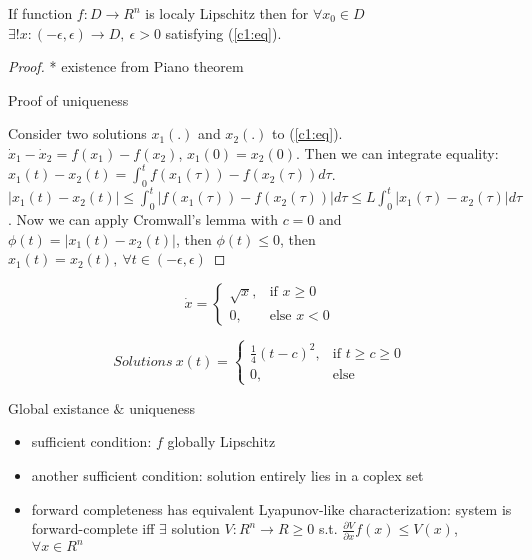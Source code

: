 \begin{Theorem}
If function $f:D \rightarrow R^n$ is localy Lipschitz then for $\forall x_0 \in D$
\ $\exists ! x:(-\epsilon, \epsilon) \rightarrow D, \ \epsilon > 0$
satisfying (\ref{c1:eq}).

\begin{proof}

* existence from Piano theorem

Proof of uniqueness

Consider two solutions $x_1(.)$ and $x_2(.)$ to (\ref{c1:eq}). $\dot x_1-\dot x_2=f(x_1)-f(x_2)$,
$x_1(0)=x_2(0)$. Then we can integrate equality: 
$x_1(t)-x_2(t)=\int^t_0 f(x_1(\tau))-f(x_2(\tau)) d\tau$.  
$|x_1(t)-x_2(t)| \le \int^t_0 |f(x_1(\tau))-f(x_2(\tau))| d\tau \le 
L \int^t_0 |x_1(\tau)-x_2(\tau)| d\tau$. Now we can apply Cromwall's lemma with $c=0$
and $\phi(t)=|x_1(t)-x_2(t)|$, then $\phi(t)\le 0$, then $x_1(t)=x_2(t), \ \forall t 
\in (-\epsilon,\epsilon)$
\end{proof}
\end{Theorem}

\begin{Example}
\begin{equation*}
    \dot x = 
    \begin{cases}
      \sqrt{x}, & \mbox{if } x \ge 0 \\
      0, & \mbox{else } x<0 
    \end{cases}
\end{equation*}

\begin{equation*}
    Solutions\ x(t) =
    \begin{cases}
      \frac{1}{4}(t-c)^2, & \mbox{if } t \ge c \ge 0 \\
      0, &\mbox {else} 
    \end{cases}
\end{equation*}
\end{Example}

Global existance $\&$ uniqueness
\begin{itemize}
 \item sufficient condition: $f$ globally Lipschitz
 \item another sufficient condition: solution entirely lies in a coplex set
 \item forward completeness has equivalent Lyapunov-like characterization: system is
      forward-complete iff $\exists$ solution $V:R^n \rightarrow R \ge 0$ s.t.
      $\frac{\partial V}{\partial x} f(x) \le V(x)$, $\forall x \in R^n$
\end{itemize}


